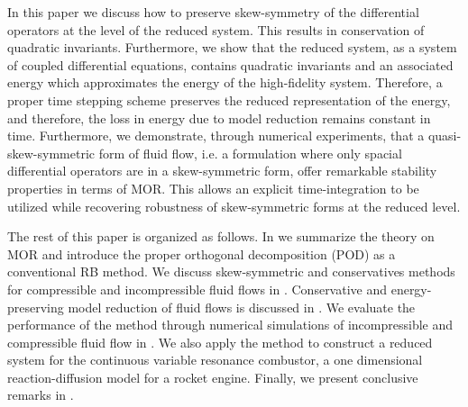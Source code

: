 In this paper we discuss how to preserve skew-symmetry of the differential operators at the level of the reduced system. This results in conservation of quadratic invariants.  Furthermore, we show that the reduced system, as a system of coupled differential equations, contains quadratic invariants and an associated energy which approximates the energy of the high-fidelity system. Therefore, a proper time stepping scheme preserves the reduced representation of the energy, and therefore, the loss in energy due to model reduction remains constant in time. Furthermore, we demonstrate, through numerical experiments, that a quasi-skew-symmetric form of fluid flow, i.e. a formulation where only spacial differential operators are in a skew-symmetric form, offer remarkable stability properties in terms of MOR. This allows an explicit time-integration to be utilized while recovering robustness of skew-symmetric forms at the reduced level.

The rest of this paper is organized as follows. In  we summarize the theory on MOR and introduce the proper orthogonal decomposition (POD) as a conventional RB method. We discuss skew-symmetric and conservatives methods for compressible and incompressible fluid flows in . Conservative and energy-preserving model reduction of fluid flows is discussed in . We evaluate the performance of the method through numerical simulations of incompressible and compressible fluid flow in . We also apply the method to construct a reduced system for the continuous variable resonance combustor, a one dimensional reaction-diffusion model for a rocket engine. Finally, we present conclusive remarks in .
